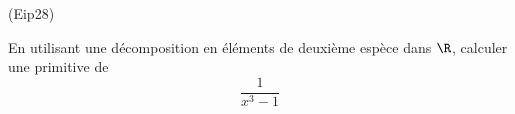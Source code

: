 \begin{tiny}(Eip28)\end{tiny} En utilisant une décomposition en éléments de deuxième espèce dans $\R$, calculer une primitive de
\begin{displaymath}
 \frac{1}{x^3-1}
\end{displaymath}